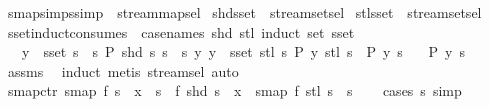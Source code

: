 \begin{isabellebody}
\isanewline
%
\endisadelimproof
\isanewline
{}\isamarkupfalse%
\isanewline
\isanewline
{}\isamarkupfalse%
\ smap{\isacharunderscore}simps{\isacharbrackleft}simp{\isacharbrackright}\ {\isacharequal}\ stream{\isachardot}map{\isacharunderscore}sel\isanewline
{}\isamarkupfalse%
\ shd{\isacharunderscore}sset\ {\isacharequal}\ stream{\isachardot}set{\isacharunderscore}sel{\isacharparenleft}{}{\isacharparenright}\isanewline
{}\isamarkupfalse%
\ stl{\isacharunderscore}sset\ {\isacharequal}\ stream{\isachardot}set{\isacharunderscore}sel{\isacharparenleft}{}{\isacharparenright}\isanewline
\isanewline
{}\isamarkupfalse%
\ sset{\isacharunderscore}induct{\isacharbrackleft}consumes\ {}{\isacharcomma}\ case{\isacharunderscore}names\ shd\ stl{\isacharcomma}\ induct\ set{\isacharcolon}\ sset{\isacharbrackright}{\isacharcolon}\isanewline
\ \ \ {\isachardoublequoteopen}y\ {\isasymin}\ sset\ s{\isachardoublequoteclose}\ \ {\isachardoublequoteopen}{\isasymAnd}s{\isachardot}\ P\ {\isacharparenleft}shd\ s{\isacharparenright}\ s{\isachardoublequoteclose}\ \ {\isachardoublequoteopen}{\isasymAnd}s\ y{\isachardot}\ {\isasymlbrakk}y\ {\isasymin}\ sset\ {\isacharparenleft}stl\ s{\isacharparenright}{\isacharsemicolon}\ P\ y\ {\isacharparenleft}stl\ s{\isacharparenright}{\isasymrbrakk}\ {\isasymLongrightarrow}\ P\ y\ s{\isachardoublequoteclose}\isanewline
\ \ \ {\isachardoublequoteopen}P\ y\ s{\isachardoublequoteclose}\isanewline
%
\isadelimproof
%
\endisadelimproof
%
\isatagproof
{}\isamarkupfalse%
\ assms\ \isamarkupfalse%
\ induct\ {\isacharparenleft}metis\ stream{\isachardot}sel{\isacharparenleft}{}{\isacharparenright}{\isacharcomma}\ auto{\isacharparenright}%
\endisatagproof
{\isafoldproof}%
%
\isadelimproof
\isanewline
%
\endisadelimproof
\isanewline
{}\isamarkupfalse%
\ smap{\isacharunderscore}ctr{\isacharcolon}\ {\isachardoublequoteopen}smap\ f\ s\ {\isacharequal}\ x\ {\isacharhash}{\isacharhash}\ s{\isacharprime}\ {\isasymlongleftrightarrow}\ f\ {\isacharparenleft}shd\ s{\isacharparenright}\ {\isacharequal}\ x\ {\isasymand}\ smap\ f\ {\isacharparenleft}stl\ s{\isacharparenright}\ {\isacharequal}\ s{\isacharprime}{\isachardoublequoteclose}\isanewline
%
\isadelimproof
\ \ %
\endisadelimproof
%
\isatagproof
{}\isamarkupfalse%
\ {\isacharparenleft}cases\ s{\isacharparenright}\ simp%
\endisatagproof
{\isafoldproof}%
%
\isadelimproof

\end{isabellebody}
